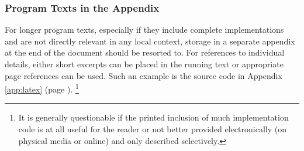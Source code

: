 \subsubsection{Program Texts in the Appendix}

For longer program texts, especially if they include complete implementations
and are not directly relevant in any local context, storage in a separate
appendix at the end of the document should be resorted to. For references to
individual details, either short excerpts can be placed in the running text
or appropriate page references can be used. Such an example is the \latex
source code in Appendix \ref{app:latex} (page \pageref{app:latex}).%
\footnote{It is generally questionable if the printed inclusion of 
much implementation code is at all useful for the reader or not better
provided electronically (on physical media or online) and only described
selectively.}

